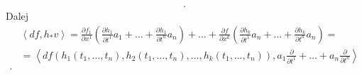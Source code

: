 \documentclass[../main.tex]{subfiles}
\begin{document}
\begin{dowod}
\begin{align*}
        .\end{align*}
        Dalej
        \begin{align*}
            &\left<df,h_*v \right> = \frac{\partial f_1}{\partial x^1} \left( \frac{\partial h_1}{\partial t^1} a_1 + \ldots + \frac{\partial h_1}{\partial t^n} a_n \right)  + \ldots + \frac{\partial f}{\partial x^k} \left( \frac{\partial h_k}{\partial t^1} a_n + \ldots + \frac{\partial h_k}{\partial t^n} a_n \right) =\\
            &= \left<df(h_1(t_1,\ldots,t_n),h_2(t_1,\ldots,t_n),\ldots,h_k(t_1,\ldots,t_n)), a_1 \frac{\partial }{\partial t^1} + \ldots + a_n \frac{\partial }{\partial t^n}  \right> \\
        .\end{align*}
    \end{dowod}
\end{document}
